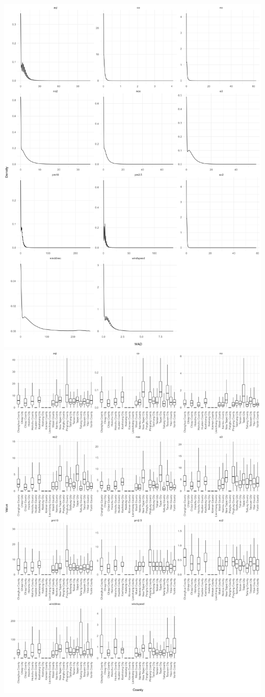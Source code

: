 \documentclass{article}
\begin{document}
\begin{enumerate}
\begin{center}
    \includegraphics[width=6in]{question7/density.png}
    \includegraphics[width=6in]{question7/qq.png}

\end{center}
\end{enumerate}
\end{document}
